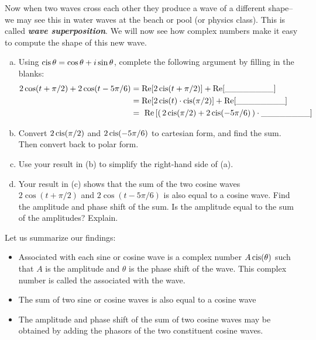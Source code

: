 Now when two waves cross each other they produce a wave of a different shape--we may see this in water waves at the beach or pool (or physics class). This is called {\bf \emph{wave superposition}}. We will now see how complex numbers make it easy to compute the shape of this new wave.

\begin{exercise}{45}
\begin{enumerate}[(a)]
\item
Using $\operatorname{cis} \theta = \cos \theta + i\sin \theta$, complete the following argument by filling in the blanks:
\begin{align*} 
2 \cos(t + \pi/2) + 2 \cos(t - 5\pi/6) &= \text{Re}[2 \operatorname{cis} (t + \pi/2)] + \text{Re}[\_\_\_\_\_\_\_\_]\\
&= \text{Re}[2 \operatorname{cis} (t) \cdot \operatorname{cis}(\pi/2)] + \textrm{Re}[\_\_\_\_\_\_\_\_]\\
&= \text{ Re} \left[\left(\, 2 \operatorname{cis}(\pi/2) + 2 \operatorname{cis}(-5\pi/6) \, \right) \cdot \_\_\_\_\_\_\_\_ \right] 
\end{align*}
\item
Convert $2 \operatorname{cis}(\pi/2)$ and $2 \operatorname{cis}(-5\pi/6)$ to cartesian form, and find the sum. Then convert back to polar form.
\item
Use your result in (b) to simplify the right-hand side of (a).
\item
Your result in (c) shows that the sum of the two cosine waves  $2\cos(t + \pi/2)$ and $2 \cos(t - 5\pi/6)$ is also equal to a cosine wave.  Find the amplitude and phase shift of the sum. Is the amplitude equal to the sum of the amplitudes? Explain.
\end{enumerate}
\end{exercise}

Let us summarize our findings:
\begin{itemize}
\item
Associated with each sine or cosine wave is a complex number $A \operatorname{cis}( \theta) $ such that $A$ is the amplitude and $\theta$ is the phase shift of the wave. This complex number is called the  associated with the wave.
\item
The sum of two sine or cosine waves is also equal to a cosine wave
\item
The amplitude and phase shift of the sum of two cosine waves may be obtained by adding the phasors of the two constituent cosine waves.
\end{itemize}


